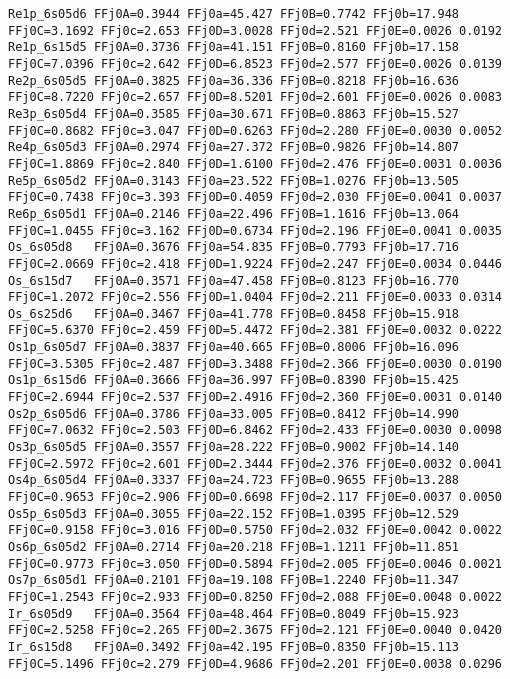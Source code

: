 {\begin{verbatim}
Re1p_6s05d6 FFj0A=0.3944 FFj0a=45.427 FFj0B=0.7742 FFj0b=17.948 FFj0C=3.1692 FFj0c=2.653 FFj0D=3.0028 FFj0d=2.521 FFj0E=0.0026 0.0192
Re1p_6s15d5 FFj0A=0.3736 FFj0a=41.151 FFj0B=0.8160 FFj0b=17.158 FFj0C=7.0396 FFj0c=2.642 FFj0D=6.8523 FFj0d=2.577 FFj0E=0.0026 0.0139
Re2p_6s05d5 FFj0A=0.3825 FFj0a=36.336 FFj0B=0.8218 FFj0b=16.636 FFj0C=8.7220 FFj0c=2.657 FFj0D=8.5201 FFj0d=2.601 FFj0E=0.0026 0.0083
Re3p_6s05d4 FFj0A=0.3585 FFj0a=30.671 FFj0B=0.8863 FFj0b=15.527 FFj0C=0.8682 FFj0c=3.047 FFj0D=0.6263 FFj0d=2.280 FFj0E=0.0030 0.0052
Re4p_6s05d3 FFj0A=0.2974 FFj0a=27.372 FFj0B=0.9826 FFj0b=14.807 FFj0C=1.8869 FFj0c=2.840 FFj0D=1.6100 FFj0d=2.476 FFj0E=0.0031 0.0036
Re5p_6s05d2 FFj0A=0.3143 FFj0a=23.522 FFj0B=1.0276 FFj0b=13.505 FFj0C=0.7438 FFj0c=3.393 FFj0D=0.4059 FFj0d=2.030 FFj0E=0.0041 0.0037
Re6p_6s05d1 FFj0A=0.2146 FFj0a=22.496 FFj0B=1.1616 FFj0b=13.064 FFj0C=1.0455 FFj0c=3.162 FFj0D=0.6734 FFj0d=2.196 FFj0E=0.0041 0.0035
Os_6s05d8   FFj0A=0.3676 FFj0a=54.835 FFj0B=0.7793 FFj0b=17.716 FFj0C=2.0669 FFj0c=2.418 FFj0D=1.9224 FFj0d=2.247 FFj0E=0.0034 0.0446
Os_6s15d7   FFj0A=0.3571 FFj0a=47.458 FFj0B=0.8123 FFj0b=16.770 FFj0C=1.2072 FFj0c=2.556 FFj0D=1.0404 FFj0d=2.211 FFj0E=0.0033 0.0314
Os_6s25d6   FFj0A=0.3467 FFj0a=41.778 FFj0B=0.8458 FFj0b=15.918 FFj0C=5.6370 FFj0c=2.459 FFj0D=5.4472 FFj0d=2.381 FFj0E=0.0032 0.0222
Os1p_6s05d7 FFj0A=0.3837 FFj0a=40.665 FFj0B=0.8006 FFj0b=16.096 FFj0C=3.5305 FFj0c=2.487 FFj0D=3.3488 FFj0d=2.366 FFj0E=0.0030 0.0190
Os1p_6s15d6 FFj0A=0.3666 FFj0a=36.997 FFj0B=0.8390 FFj0b=15.425 FFj0C=2.6944 FFj0c=2.537 FFj0D=2.4916 FFj0d=2.360 FFj0E=0.0031 0.0140
Os2p_6s05d6 FFj0A=0.3786 FFj0a=33.005 FFj0B=0.8412 FFj0b=14.990 FFj0C=7.0632 FFj0c=2.503 FFj0D=6.8462 FFj0d=2.433 FFj0E=0.0030 0.0098
Os3p_6s05d5 FFj0A=0.3557 FFj0a=28.222 FFj0B=0.9002 FFj0b=14.140 FFj0C=2.5972 FFj0c=2.601 FFj0D=2.3444 FFj0d=2.376 FFj0E=0.0032 0.0041
Os4p_6s05d4 FFj0A=0.3337 FFj0a=24.723 FFj0B=0.9655 FFj0b=13.288 FFj0C=0.9653 FFj0c=2.906 FFj0D=0.6698 FFj0d=2.117 FFj0E=0.0037 0.0050
Os5p_6s05d3 FFj0A=0.3055 FFj0a=22.152 FFj0B=1.0395 FFj0b=12.529 FFj0C=0.9158 FFj0c=3.016 FFj0D=0.5750 FFj0d=2.032 FFj0E=0.0042 0.0022
Os6p_6s05d2 FFj0A=0.2714 FFj0a=20.218 FFj0B=1.1211 FFj0b=11.851 FFj0C=0.9773 FFj0c=3.050 FFj0D=0.5894 FFj0d=2.005 FFj0E=0.0046 0.0021
Os7p_6s05d1 FFj0A=0.2101 FFj0a=19.108 FFj0B=1.2240 FFj0b=11.347 FFj0C=1.2543 FFj0c=2.933 FFj0D=0.8250 FFj0d=2.088 FFj0E=0.0048 0.0022
Ir_6s05d9   FFj0A=0.3564 FFj0a=48.464 FFj0B=0.8049 FFj0b=15.923 FFj0C=2.5258 FFj0c=2.265 FFj0D=2.3675 FFj0d=2.121 FFj0E=0.0040 0.0420
Ir_6s15d8   FFj0A=0.3492 FFj0a=42.195 FFj0B=0.8350 FFj0b=15.113 FFj0C=5.1496 FFj0c=2.279 FFj0D=4.9686 FFj0d=2.201 FFj0E=0.0038 0.0296

\end{verbatim}}
